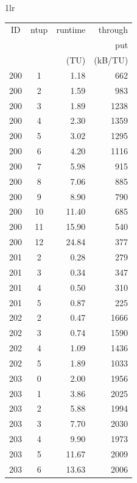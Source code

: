 \documentclass[
  digital,     %
  oneside,     %
  nosansbold,  %
  nocolorbold, %
  nolof,         %
  nolot,         %
]{fithesis4}
\begin{document}
\begin{table}[H]
  \begin{tabularx}{1\textwidth}{lr}
    {\begin{tabularx}{0.5\textwidth}{c|c|r|r}
        ID & ntup & runtime & through\\
         & & & put \\
         & & (TU) & (kB/TU) \\
        \midrule
        200 & 1 & 1.18 & 662 \\
        200 & 2 & 1.59 & 983 \\
        200 & 3 & 1.89 & 1238 \\
        200 & 4 & 2.30 & 1359 \\
        200 & 5 & 3.02 & 1295 \\
        200 & 6 & 4.20 & 1116 \\
        200 & 7 & 5.98 & 915 \\
        200 & 8 & 7.06 & 885 \\
        200 & 9 & 8.90 & 790 \\
        200 & 10 & 11.40 & 685 \\
        200 & 11 & 15.90 & 540 \\
        200 & 12 & 24.84 & 377 \\
        201 & 2 & 0.28 & 279 \\
        201 & 3 & 0.34 & 347 \\
        201 & 4 & 0.50 & 310 \\
        201 & 5 & 0.87 & 225 \\
        202 & 2 & 0.47 & 1666 \\
        202 & 3 & 0.74 & 1590 \\
        202 & 4 & 1.09 & 1436 \\
        202 & 5 & 1.89 & 1033 \\
        203 & 0 & 2.00 & 1956 \\
        203 & 1 & 3.86 & 2025 \\
        203 & 2 & 5.88 & 1994 \\
        203 & 3 & 7.70 & 2030 \\
        203 & 4 & 9.90 & 1973 \\
        203 & 5 & 11.67 & 2009 \\
        203 & 6 & 13.63 & 2006 \\
    \end{tabularx}} 


\end{tabularx}
\end{table}
\end{document}

